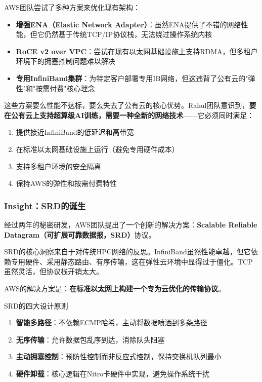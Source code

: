 AWS团队尝试了多种方案来优化现有架构：

\begin{itemize}
    \item \textbf{增强ENA（Elastic Network Adapter）}：虽然ENA提供了不错的网络性能，但它仍然基于传统TCP/IP协议栈，无法绕过操作系统内核
    \item \textbf{RoCE v2 over VPC}：尝试在现有以太网基础设施上支持RDMA，但多租户环境下的拥塞控制问题难以解决
    \item \textbf{专用InfiniBand集群}：为特定客户部署专用IB网络，但这违背了公有云的"弹性"和"按需付费"核心理念
\end{itemize}

这些方案要么性能不达标，要么失去了公有云的核心优势。Rahul团队意识到，\textbf{要在公有云上支持超算级AI训练，需要一种全新的网络技术}——它必须同时满足：

\begin{enumerate}
    \item 提供接近InfiniBand的低延迟和高带宽
    \item 在标准以太网基础设施上运行（避免专用硬件成本）
    \item 支持多租户环境的安全隔离
    \item 保持AWS的弹性和按需付费特性
\end{enumerate}

\subsubsection{Insight：SRD的诞生}

经过两年的秘密研发，AWS团队提出了一个创新的解决方案：\textbf{Scalable Reliable Datagram（可扩展可靠数据报，SRD）}协议。

SRD的核心洞察来自于对传统HPC网络的反思。InfiniBand虽然性能卓越，但它依赖专用硬件、采用静态路由、有序传输，这在弹性云环境中显得过于僵化。TCP虽然灵活，但协议栈开销太大。

AWS的解决方案是：\textbf{在标准以太网上构建一个专为云优化的传输协议}。

\begin{insightbox}{SRD的四大设计原则}
\begin{enumerate}
    \item \textbf{智能多路径}：不依赖ECMP哈希，主动将数据喷洒到多条路径
    \item \textbf{无序传输}：允许数据包乱序到达，消除队头阻塞
    \item \textbf{主动拥塞控制}：预防性控制而非反应式控制，保持交换机队列最小
    \item \textbf{硬件卸载}：核心逻辑在Nitro卡硬件中实现，避免操作系统干扰
\end{enumerate}
\end{insightbox}

